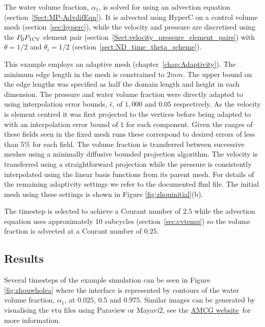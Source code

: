 The water volume fraction, $\alpha_1$, is solved for using an advection equation (section~\ref{Sect:MP-AdvdifEqn}).  It is advected
using HyperC on a control volume mesh (section~\ref{sec:hyperc}), while the velocity and pressure are discretised using the
$P_0P_{1\mathrm{CV}}$ element pair (section~\ref{Sect:velocity_pressure_element_pairs}) with $\theta=1/2$ and $\theta_i=1/2$ (section~\ref{sect:ND_time_theta_scheme}).  

This example employs an adaptive mesh (chapter~\ref{chap:Adaptivity}). The minimum edge length in the mesh is constrained to $2mm$. The upper bound on the edge lengths was specified as half the domain length and height in each dimension.  The pressure and water volume fraction were directly adapted to using interpolation error bounds, $\hat{\epsilon}$, of $1,000$ and $0.05$ respectively.  As the velocity is element centred it was first projected to the vertices before being adapted to with an interpolation error bound of $1$ for each component.  Given the ranges of these fields seen in the fixed mesh runs these correspond to desired errors of less than 5\% for each field. The volume fraction is transferred between successive meshes using a minimally diffusive bounded projection algorithm.  The velocity is transferred using a straightforward projection while the pressure is consistently interpolated using the linear basis functions from its parent mesh. For details of the remaining adaptivity settings we refer to the documented flml file.  The initial mesh using these settings is shown in Figure \ref{fig:zhouinitial}(b). 

The timestep is selected to achieve a Courant number of $2.5$ while the advection equation uses approximately $10$ subcycles
(section~\ref{sec:cvtemp}) so the volume fraction is advected at a Courant number of $0.25$.  

\subsection{Results}
Several timesteps of the example simulation can be seen in Figure \ref{fig:zhouwholea} where the interface is represented by
contours of the water volume fraction, $\alpha_1$, at $0.025$, $0.5$ and $0.975$.  Similar images can be generated by visualising
the vtu files using Paraview or Mayavi2, see the \href{http://amcg-www.ese.ic.ac.uk/}{AMCG website}\ for more information.

